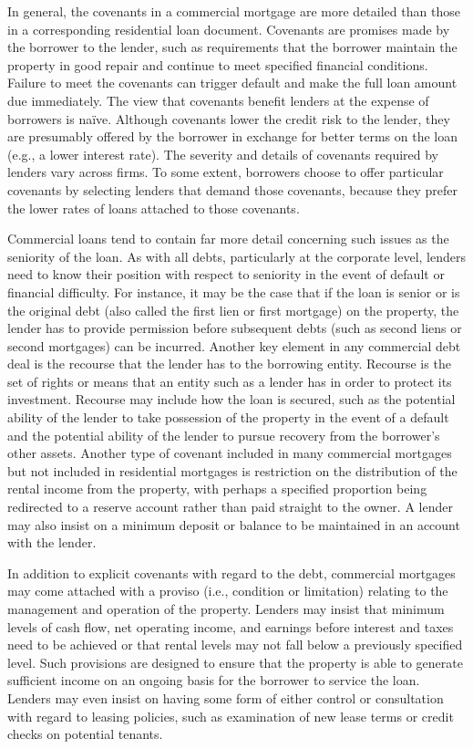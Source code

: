 \documentclass[11pt]{article}
\begin{document}
In general, the covenants in a commercial mortgage are more detailed than those in a corresponding residential loan document. Covenants are promises made by the borrower to the lender, such as requirements that the borrower maintain the property in good repair and continue to meet specified financial conditions. Failure to meet the covenants can trigger default and make the full loan amount due immediately. The view that covenants benefit lenders at the expense of borrowers is naïve. Although covenants lower the credit risk to the lender, they are presumably offered by the borrower in exchange for better terms on the loan (e.g., a lower interest rate). The severity and details of covenants required by lenders vary across firms. To some extent, borrowers choose to offer particular covenants by selecting lenders that demand those covenants, because they prefer the lower rates of loans attached to those covenants.

Commercial loans tend to contain far more detail concerning such issues as the seniority of the loan. As with all debts, particularly at the corporate level, lenders need to know their position with respect to seniority in the event of default or financial difficulty. For instance, it may be the case that if the loan is senior or is the original debt (also called the first lien or first mortgage) on the property, the lender has to provide permission before subsequent debts (such as second liens or second mortgages) can be incurred. Another key element in any commercial debt deal is the recourse that the lender has to the borrowing entity. Recourse is the set of rights or means that an entity such as a lender has in order to protect its investment. Recourse may include how the loan is secured, such as the potential ability of the lender to take possession of the property in the event of a default and the potential ability of the lender to pursue recovery from the borrower's other assets. Another type of covenant included in many commercial mortgages but not included in residential mortgages is restriction on the distribution of the rental income from the property, with perhaps a specified proportion being redirected to a reserve account rather than paid straight to the owner. A lender may also insist on a minimum deposit or balance to be maintained in an account with the lender.

In addition to explicit covenants with regard to the debt, commercial mortgages may come attached with a proviso (i.e., condition or limitation) relating to the management and operation of the property. Lenders may insist that minimum levels of cash flow, net operating income, and earnings before interest and taxes need to be achieved or that rental levels may not fall below a previously specified level. Such provisions are designed to ensure that the property is able to generate sufficient income on an ongoing basis for the borrower to service the loan. Lenders may even insist on having some form of either control or consultation with regard to leasing policies, such as examination of new lease terms or credit checks on potential tenants.
\end{document}
